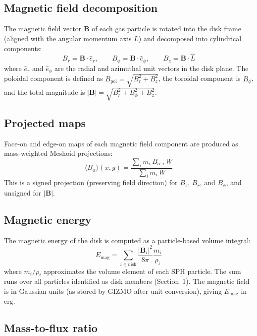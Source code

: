 \documentclass[12pt]{article}
\begin{document}
\subsection*{Magnetic field decomposition}

The magnetic field vector $\mathbf{B}$ of each gas particle is rotated into the
disk frame (aligned with the angular momentum axis $\hat{L}$) and decomposed into
cylindrical components:
\begin{equation}
    B_r = \mathbf{B} \cdot \hat{e}_r, \qquad
    B_\phi = \mathbf{B} \cdot \hat{e}_\phi, \qquad
    B_z = \mathbf{B} \cdot \hat{L}
\end{equation}
where $\hat{e}_r$ and $\hat{e}_\phi$ are the radial and azimuthal unit vectors in
the disk plane. The poloidal component is defined as
$B_\mathrm{pol} = \sqrt{B_r^2 + B_z^2}$, the toroidal component is $B_\phi$,
and the total magnitude is $|\mathbf{B}| = \sqrt{B_r^2 + B_\phi^2 + B_z^2}$.

\subsection*{Projected maps}

Face-on and edge-on maps of each magnetic field component are produced as
mass-weighted Meshoid projections:
\begin{equation}
    \langle B_\alpha \rangle(x,y)
    = \frac{\sum_i m_i\,B_{\alpha,i}\,W}{\sum_i m_i\,W}
\end{equation}
This is a signed projection (preserving field direction) for $B_z$, $B_r$, and
$B_\phi$, and unsigned for $|\mathbf{B}|$.

\subsection*{Magnetic energy}

The magnetic energy of the disk is computed as a particle-based volume integral:
\begin{equation}
    E_\mathrm{mag} = \sum_{i \in \mathrm{disk}} \frac{|\mathbf{B}_i|^2}{8\pi}
    \frac{m_i}{\rho_i}
\end{equation}
where $m_i/\rho_i$ approximates the volume element of each SPH particle. The
sum runs over all particles identified as disk members (Section~1). The magnetic
field is in Gaussian units (as stored by GIZMO after unit conversion), giving
$E_\mathrm{mag}$ in erg.

\subsection*{Mass-to-flux ratio}
\end{document}
